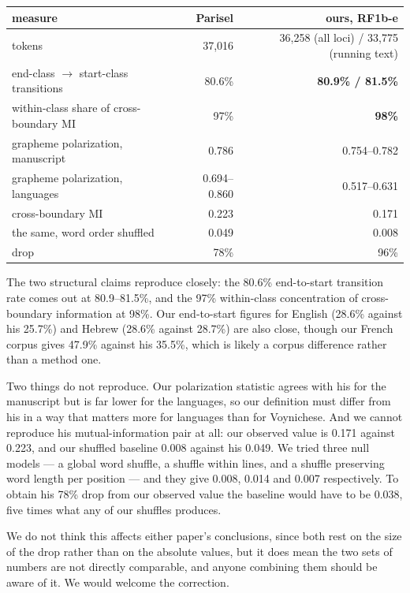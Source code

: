 \documentclass[11pt,a4paper]{article}
\begin{document}
\begin{table}[htbp]\centering\small
\begin{tabular}{@{}lrr@{}}
\toprule
measure & Parisel & ours, RF1b-e \\
\midrule
tokens & 37,016 & 36,258 (all loci) / 33,775 (running text) \\
end-class $\to$ start-class transitions & 80.6\% & \textbf{80.9\% / 81.5\%} \\
within-class share of cross-boundary MI & 97\% & \textbf{98\%} \\
grapheme polarization, manuscript & 0.786 & 0.754--0.782 \\
grapheme polarization, languages & 0.694--0.860 & 0.517--0.631 \\
cross-boundary MI & 0.223 & 0.171 \\
the same, word order shuffled & 0.049 & 0.008 \\
drop & 78\% & 96\% \\
\bottomrule
\end{tabular}
\end{table}


The two structural claims reproduce closely: the 80.6\% end-to-start transition rate comes out at 80.9--81.5\%, and the 97\% within-class concentration of cross-boundary information at 98\%. Our end-to-start figures for English (28.6\% against his 25.7\%) and Hebrew (28.6\% against 28.7\%) are also close, though our French corpus gives 47.9\% against his 35.5\%, which is likely a corpus difference rather than a method one.


Two things do not reproduce. Our polarization statistic agrees with his for the manuscript but is far lower for the languages, so our definition must differ from his in a way that matters more for languages than for Voynichese. And we cannot reproduce his mutual-information pair at all: our observed value is 0.171 against 0.223, and our shuffled baseline 0.008 against his 0.049. We tried three null models --- a global word shuffle, a shuffle within lines, and a shuffle preserving word length per position --- and they give 0.008, 0.014 and 0.007 respectively. To obtain his 78\% drop from our observed value the baseline would have to be 0.038, five times what any of our shuffles produces.


We do not think this affects either paper's conclusions, since both rest on the size of the drop rather than on the absolute values, but it does mean the two sets of numbers are not directly comparable, and anyone combining them should be aware of it. We would welcome the correction.
\end{document}
